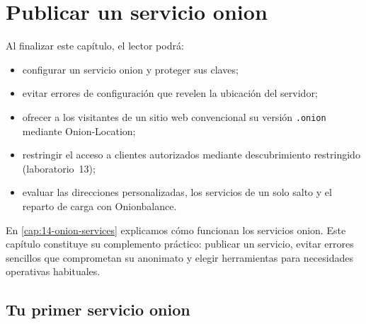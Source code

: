 \chapter{Publicar un servicio onion}\label{cap:21-onion-pratica}

\begin{obiettivi}
Al finalizar este capítulo, el lector podrá:
\begin{itemize}[nosep]
  \item configurar un servicio onion y proteger sus claves;
  \item evitar errores de configuración que revelen la ubicación del servidor;
  \item ofrecer a los visitantes de un sitio web convencional su versión \texttt{.onion} mediante Onion-Location;
  \item restringir el acceso a clientes autorizados mediante descubrimiento restringido (laboratorio~13);
  \item evaluar las direcciones personalizadas, los servicios de un solo salto y el reparto de carga con Onionbalance.
\end{itemize}
\end{obiettivi}

En \cref{cap:14-onion-services} explicamos cómo funcionan los servicios onion. Este capítulo constituye su complemento práctico: publicar un servicio, evitar errores sencillos que comprometan su anonimato y elegir herramientas para necesidades operativas habituales.

\section{Tu primer servicio onion}\label{sec:onionp-primo}

